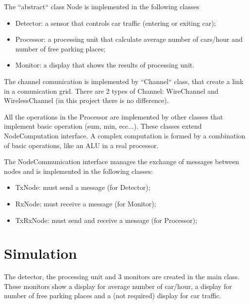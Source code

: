 \documentclass[a4paper,titlepage]{article}
\begin{document}
The ``abstract`` class Node is implemented in the following classes

\begin{itemize}[noitemsep,topsep=20pt,parsep=10pt,partopsep=20pt]

\item Detector: a sensor that controls car traffic (entering or exiting car);
\item Processor: a processing unit that calculate average number of cars/hour and number of free parking places;
\item Monitor: a display that shows the results of processing unit.

\end{itemize}

The channel comunication is implemented by ``Channel`` class, that create a link in a comunication grid. There are 2 types of Channel: WireChannel and WirelessChannel (in this project there is no difference).

All the operations in the Processor are implemented by other classes that implement basic operation (sum, min, ecc...). These classes extend NodeComputation interface. A complex computation is formed by a combination of basic operations, like an ALU in a real processor.

The NodeCommunication interface manages the exchange of messages between nodes and is implemented in the following classes:

\begin{itemize}[noitemsep,topsep=20pt,parsep=10pt,partopsep=20pt]

\item TxNode: must send a message (for Detector);

\item RxNode: must receive a message (for Monitor);

\item TxRxNode: must send and receive a message (for Processor);

\end{itemize}

\newpage
\part{Simulation}

The detector, the processing unit and 3 monitors are created in the main class. These monitors show a display for average number of car/hour, a display for number of free parking places and a (not required) display for car traffic.
\end{document}
